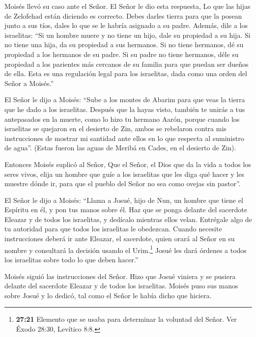  Moisés llevó su caso ante el Señor.  El Señor
le dio esta respuesta,  Lo que las hijas de Zelofehad están
diciendo es correcto. Debes darles tierra para que la posean junto a sus
tíos, dales lo que se le habría asignado a su padre. 
Además, dile a los israelitas: ``Si un hombre muere y no tiene un hijo,
dale su propiedad a su hija.  Si no tiene una hija, da su
propiedad a sus hermanos.  Si no tiene hermanos, dé su
propiedad a los hermanos de su padre.  Si su padre no tiene
hermanos, déle su propiedad a los parientes más cercanos de su familia
para que puedan ser dueños de ella. Esta es una regulación legal para
los israelitas, dada como una orden del Señor a Moisés.''

 El Señor le dijo a Moisés: ``Sube a los montes de Abarim
para que veas la tierra que he dado a los israelitas. 
Después que la hayas visto, también te unirás a tus antepasados en la
muerte, como lo hizo tu hermano Aarón,  porque cuando los
israelitas se quejaron en el desierto de Zin, ambos se rebelaron contra
mis instrucciones de mostrar mi santidad ante ellos en lo que respecta
al suministro de agua''. (Estas fueron las aguas de Meribá en Cades, en
el desierto de Zin).

 Entonces Moisés suplicó al Señor,  Que el
Señor, el Dios que da la vida a todos los seres vivos, elija un hombre
que guíe a los israelitas  que les diga qué hacer y les
muestre dónde ir, para que el pueblo del Señor no sea como ovejas sin
pastor''.

 El Señor le dijo a Moisés: ``Llama a Josué, hijo de Nun,
un hombre que tiene el Espíritu en él, y pon tus manos sobre él.
 Haz que se ponga delante del sacerdote Eleazar y de todos
los israelitas, y dedícalo mientras ellos velan.  Entrégale
algo de tu autoridad para que todos los israelitas le obedezcan.
 Cuando necesite instrucciones deberá ir ante Eleazar, el
sacerdote, quien orará al Señor en su nombre y consultará la decisión
usando el Urim.\footnote{\textbf{27:21} Elemento que se usaba para
  determinar la voluntad del Señor. Ver Éxodo 28:30, Levítico 8:8.}
Josué les dará órdenes a todos los israelitas sobre todo lo que deben
hacer.''

 Moisés siguió las instrucciones del Señor. Hizo que Josué
viniera y se pusiera delante del sacerdote Eleazar y de todos los
israelitas.  Moisés puso sus manos sobre Josué y lo dedicó,
tal como el Señor le había dicho que hiciera.


